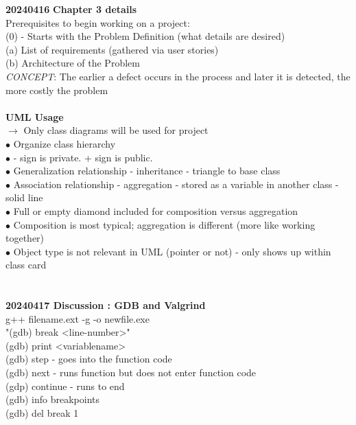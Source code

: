 \documentclass[11pt]{article}
\begin{document}
    \textbf{20240416}
    \textbf{Chapter 3 details}\\
    Prerequisites to begin working on a project:\\
    (0) - Starts with the Problem Definition (what details are desired)\\
    (a) List of requirements (gathered via user stories)\\
    (b) Architecture of the Problem\\
    

    \textit{CONCEPT}: The earlier a defect occurs in the process and later 
    it is detected, the more costly the problem\\
    \\
    \textbf{UML Usage}\\
    $\rightarrow$ Only class diagrams will be used for project\\
    \indent $\bullet$ Organize class hierarchy\\
    \indent $\bullet$ - sign is private. + sign is public.  \\
    \indent $\bullet$ Generalization relationship - inheritance - triangle to base class  \\
    \indent $\bullet$ Association relationship - aggregation - stored as a variable in another class - solid line  \\
    \indent\indent$\bullet$ Full or empty diamond included for composition versus aggregation \\
    \indent\indent$\bullet$ Composition is most typical; aggregation is different (more like working together)\\
    \indent $\bullet$ Object type is not relevant in UML (pointer or not) - only shows up within class card  \\
    \\ \\
    \textbf{20240417 Discussion : GDB and Valgrind}\\
    g++ filename.ext -g -o newfile.exe\\
    "(gdb) break <line-number>"\\
    (gdb) print <variablename>\\
    (gdb) step - goes into the function code\\
    (gdb) next - runs function but does not enter function code\\
    (gdp) continue - runs to end\\
    (gdb) info breakpoints\\
    (gdb) del break 1\\
\end{document}
